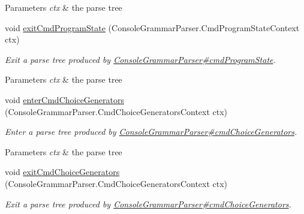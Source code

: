 \begin{DoxyCompactItemize}
\begin{DoxyCompactList}
\begin{DoxyParams}{Parameters}
{\em ctx} & the parse tree\\
\hline
\end{DoxyParams}
 \end{DoxyCompactList}\item 
void \hyperlink{classgov_1_1nasa_1_1jpf_1_1inspector_1_1client_1_1parser_1_1_console_grammar_base_listener_a531b072e4572145c1d5180de8faabdc0}{exit\+Cmd\+Program\+State} (Console\+Grammar\+Parser.\+Cmd\+Program\+State\+Context ctx)
\begin{DoxyCompactList}\small\item\em Exit a parse tree produced by \hyperlink{classgov_1_1nasa_1_1jpf_1_1inspector_1_1client_1_1parser_1_1_console_grammar_parser_ad1e3d393488b8ab29c12899535ecf1cd}{Console\+Grammar\+Parser\#cmd\+Program\+State}.


\begin{DoxyParams}{Parameters}
{\em ctx} & the parse tree\\
\hline
\end{DoxyParams}
 \end{DoxyCompactList}\item 
void \hyperlink{classgov_1_1nasa_1_1jpf_1_1inspector_1_1client_1_1parser_1_1_console_grammar_base_listener_a8cfd97da766950a9182215535bf17a9e}{enter\+Cmd\+Choice\+Generators} (Console\+Grammar\+Parser.\+Cmd\+Choice\+Generators\+Context ctx)
\begin{DoxyCompactList}\small\item\em Enter a parse tree produced by \hyperlink{classgov_1_1nasa_1_1jpf_1_1inspector_1_1client_1_1parser_1_1_console_grammar_parser_ae1f2f3e73caeaccbd742f2842d4c986a}{Console\+Grammar\+Parser\#cmd\+Choice\+Generators}.


\begin{DoxyParams}{Parameters}
{\em ctx} & the parse tree\\
\hline
\end{DoxyParams}
 \end{DoxyCompactList}\item 
void \hyperlink{classgov_1_1nasa_1_1jpf_1_1inspector_1_1client_1_1parser_1_1_console_grammar_base_listener_aa31529f83429980922e5cb57f1e8f42c}{exit\+Cmd\+Choice\+Generators} (Console\+Grammar\+Parser.\+Cmd\+Choice\+Generators\+Context ctx)
\begin{DoxyCompactList}\small\item\em Exit a parse tree produced by \hyperlink{classgov_1_1nasa_1_1jpf_1_1inspector_1_1client_1_1parser_1_1_console_grammar_parser_ae1f2f3e73caeaccbd742f2842d4c986a}{Console\+Grammar\+Parser\#cmd\+Choice\+Generators}.



\end{DoxyCompactList}
\end{DoxyCompactItemize}

